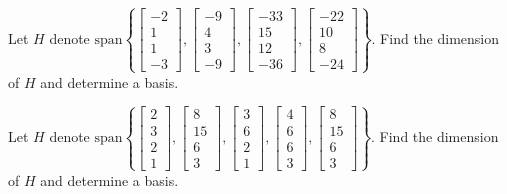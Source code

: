 \documentclass{ximera}
\begin{document}
\begin{problem}\label{prb:5.3} Let $H$ denote $\mbox{span}\left\{ \left[
\begin{array}{r}
-2 \\
1 \\
1 \\
-3
\end{array}
\right] ,\left[
\begin{array}{r}
-9 \\
4 \\
3 \\
-9
\end{array}
\right] ,\left[
\begin{array}{r}
-33 \\
15 \\
12 \\
-36
\end{array}
\right] ,\left[
\begin{array}{r}
-22 \\
10 \\
8 \\
-24
\end{array}
\right] \right\} .$ Find the dimension of $H$ and determine a basis.

\end{problem}

\begin{problem}\label{prb:5.5} Let $H$ denote $\mbox{span}\left\{ \left[
\begin{array}{r}
2 \\
3 \\
2 \\
1
\end{array}
\right] ,\left[
\begin{array}{r}
8 \\
15 \\
6 \\
3
\end{array}
\right] ,\left[
\begin{array}{r}
3 \\
6 \\
2 \\
1
\end{array}
\right] ,\left[
\begin{array}{r}
4 \\
6 \\
6 \\
3
\end{array}
\right] ,\left[
\begin{array}{r}
8 \\
15 \\
6 \\
3
\end{array}
\right] \right\} .$ Find the dimension of $H$ and determine a basis.

\end{problem}
\end{document}
